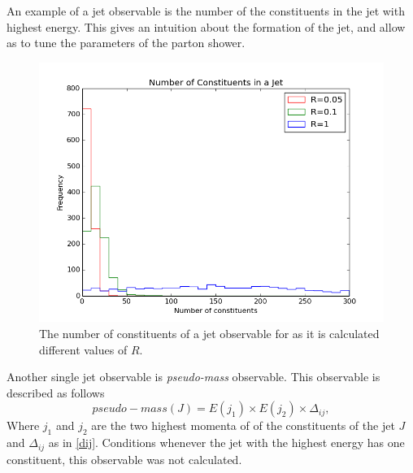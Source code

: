 An example of a jet observable is the number of the constituents in the jet with highest energy.  This gives an intuition about the formation of the jet, and allow as to tune the parameters of the parton shower.
\begin{figure}[hbtp]
\centering
\includegraphics[scale=.5]{images/n_of_con_obs.png}
\caption{The number of constituents of a jet observable for as it is calculated different  values of $R$.  
}\label{nofcon}
\end{figure}


Another single jet observable is \textit{pseudo-mass} observable. This observable is described as follows \begin{equation}
pseudo-mass(J) = E(j_1) \times E(j_2) \times \Delta_{ij} ,
\end{equation}   Where $j_1$ and $j_2$ are the two highest  momenta of of the constituents of the jet $J$ and $\Delta_{ij}$ as in \ref{dij}.
Conditions whenever
the jet with the highest energy has one constituent, this observable was not calculated.


